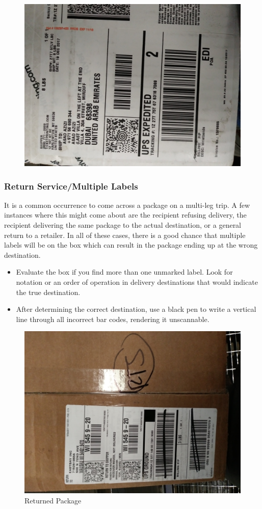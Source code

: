 \documentclass[12pt]{article}
\begin{document}
\begin{figure}[H]
    \centering
    \includegraphics[width=0.4\linewidth]{20171221_161139}
    \caption{}
\end{figure}

\subsubsection{Return Service/Multiple Labels}
It is a common occurrence to come across a package on a multi-leg trip. A few instances where this might come about are the recipient refusing delivery, the recipient delivering the same package to the actual destination, or a general return to a retailer. In all of these cases, there is a good chance that multiple labels will be on the box which can result in the package ending up at the wrong destination. 

\begin{itemize}
    \item Evaluate the box if you find more than one unmarked label. Look for notation or an order of operation in delivery destinations that would indicate the true destination.
    \item After determining the correct destination, use a black pen to write a vertical line through all incorrect bar codes, rendering it unscannable. 
\end{itemize}

\begin{figure}[H]
    \centering
    \includegraphics[width=0.4\linewidth]{20171221_171958}
    \caption{Returned Package}
\end{figure}

\clearpage
\end{document}
